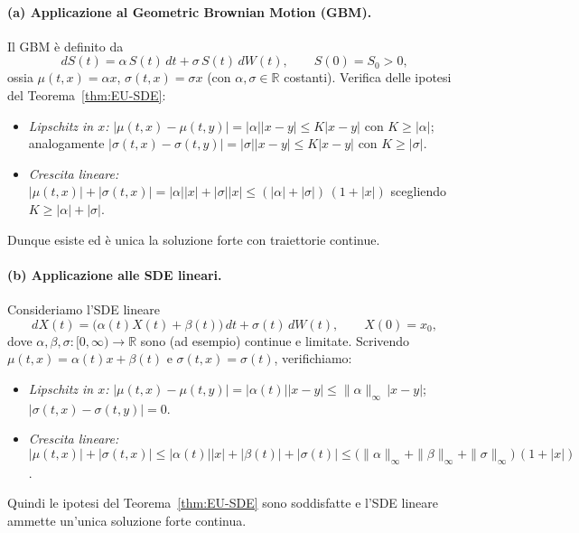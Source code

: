 \documentclass[12pt,a4paper]{book}
\theoremstyle{remark}
\begin{document}
\paragraph{(a) Applicazione al Geometric Brownian Motion (GBM).}
Il GBM è definito da
\[
dS(t)=\alpha\,S(t)\,dt+\sigma\,S(t)\,dW(t),\qquad S(0)=S_0>0,
\]
ossia $\mu(t,x)=\alpha x$, $\sigma(t,x)=\sigma x$ (con $\alpha,\sigma\in\mathbb{R}$ costanti).
Verifica delle ipotesi del Teorema~\ref{thm:EU-SDE}:
\begin{itemize}
\item \emph{Lipschitz in $x$:}\; $|\mu(t,x)-\mu(t,y)|=|\alpha||x-y|\le K|x-y|$ con $K\ge|\alpha|$;\; analogamente $|\sigma(t,x)-\sigma(t,y)|=|\sigma||x-y|\le K|x-y|$ con $K\ge|\sigma|$.
\item \emph{Crescita lineare:}\; $|\mu(t,x)|+|\sigma(t,x)|=|\alpha||x|+|\sigma||x|\le (|\alpha|+|\sigma|)\,(1+|x|)$ scegliendo $K\ge|\alpha|+|\sigma|$.
\end{itemize}
Dunque esiste ed è unica la soluzione forte con traiettorie continue. %

\paragraph{(b) Applicazione alle SDE lineari.}
Consideriamo l'SDE lineare
\[
dX(t)=\big(\alpha(t)X(t)+\beta(t)\big)\,dt+\sigma(t)\,dW(t),\qquad X(0)=x_0,
\]
dove $\alpha,\beta,\sigma:[0,\infty)\to\mathbb{R}$ sono (ad esempio) continue e limitate.
Scrivendo $\mu(t,x)=\alpha(t)x+\beta(t)$ e $\sigma(t,x)=\sigma(t)$, verifichiamo:
\begin{itemize}
\item \emph{Lipschitz in $x$:}\; $|\mu(t,x)-\mu(t,y)|=|\alpha(t)||x-y|\le \|\alpha\|_\infty\,|x-y|$;\; $|\sigma(t,x)-\sigma(t,y)|=0$.
\item \emph{Crescita lineare:}\; $|\mu(t,x)|+|\sigma(t,x)|
\le |\alpha(t)||x|+|\beta(t)|+|\sigma(t)|
\le \big(\|\alpha\|_\infty+\|\beta\|_\infty+\|\sigma\|_\infty\big)\,(1+|x|)$.
\end{itemize}
Quindi le ipotesi del Teorema~\ref{thm:EU-SDE} sono soddisfatte e l'SDE lineare ammette un'unica soluzione forte continua. %
\end{document}
